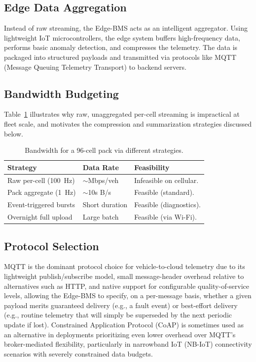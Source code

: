 \subsection{Edge Data Aggregation}
\label{subsec:15_edge_aggregation}

Instead of raw streaming, the Edge-BMS acts as an intelligent aggregator. Using lightweight IoT microcontrollers, the edge system buffers high-frequency data, performs basic anomaly detection, and compresses the telemetry. The data is packaged into structured payloads and transmitted via protocols like MQTT (Message Queuing Telemetry Transport) to backend servers.

\subsection{Bandwidth Budgeting}
\label{subsec:15_bandwidth}

Table~\ref{tab:15_bandwidth_budget} illustrates why raw, unaggregated per-cell streaming is impractical at fleet scale, and motivates the compression and summarization strategies discussed below.

\begin{table}[htbp]
\centering
\footnotesize
\caption{Bandwidth for a 96-cell pack via different strategies.}
\label{tab:15_bandwidth_budget}
\renewcommand{\arraystretch}{1.2}
\begin{tabularx}{\columnwidth}{@{} >{\raggedright\arraybackslash}X >{\raggedright\arraybackslash}X >{\raggedright\arraybackslash}X @{}}
\toprule
\textbf{Strategy} & \textbf{Data Rate} & \textbf{Feasibility} \\
\midrule
Raw per-cell (100~Hz) & $\sim$Mbps/veh & Infeasible on cellular. \\
Pack aggregate (1~Hz) & $\sim$10s B/s & Feasible (standard). \\
Event-triggered bursts & Short duration & Feasible (diagnostics). \\
Overnight full upload & Large batch & Feasible (via Wi-Fi). \\
\bottomrule
\end{tabularx}
\end{table}

\subsection{Protocol Selection}
\label{subsec:15_protocol}

MQTT is the dominant protocol choice for vehicle-to-cloud telemetry due to its lightweight publish/subscribe model, small message-header overhead relative to alternatives such as HTTP, and native support for configurable quality-of-service levels, allowing the Edge-BMS to specify, on a per-message basis, whether a given payload merits guaranteed delivery (e.g., a fault event) or best-effort delivery (e.g., routine telemetry that will simply be superseded by the next periodic update if lost). Constrained Application Protocol (CoAP) is sometimes used as an alternative in deployments prioritizing even lower overhead over MQTT's broker-mediated flexibility, particularly in narrowband IoT (NB-IoT) connectivity scenarios with severely constrained data budgets.

